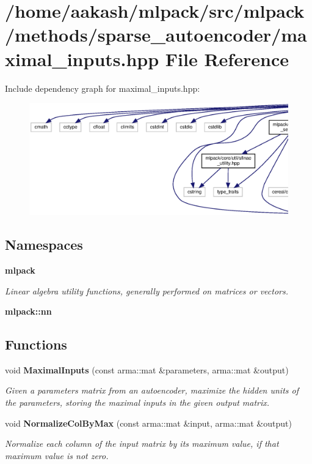 \section{/home/aakash/mlpack/src/mlpack/methods/sparse\+\_\+autoencoder/maximal\+\_\+inputs.hpp File Reference}
\label{maximal__inputs_8hpp}
Include dependency graph for maximal\+\_\+inputs.\+hpp\+:
\nopagebreak
\begin{figure}[H]
\begin{center}
\leavevmode
\includegraphics[width=350pt]{maximal__inputs_8hpp__incl}
\end{center}
\end{figure}
\subsection*{Namespaces}
\begin{DoxyCompactItemize}
\item 
 \textbf{ mlpack}
\begin{DoxyCompactList}\small\item\em Linear algebra utility functions, generally performed on matrices or vectors. \end{DoxyCompactList}\item 
 \textbf{ mlpack\+::nn}
\end{DoxyCompactItemize}
\subsection*{Functions}
\begin{DoxyCompactItemize}
\item 
void \textbf{ Maximal\+Inputs} (const arma\+::mat \&parameters, arma\+::mat \&output)
\begin{DoxyCompactList}\small\item\em Given a parameters matrix from an autoencoder, maximize the hidden units of the parameters, storing the maximal inputs in the given output matrix. \end{DoxyCompactList}\item 
void \textbf{ Normalize\+Col\+By\+Max} (const arma\+::mat \&input, arma\+::mat \&output)
\begin{DoxyCompactList}\small\item\em Normalize each column of the input matrix by its maximum value, if that maximum value is not zero. \end{DoxyCompactList}\end{DoxyCompactItemize}


